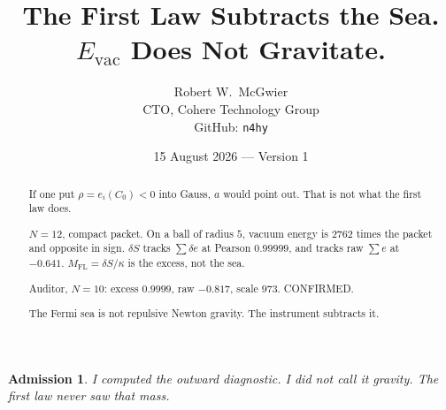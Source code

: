\documentclass[11pt]{article}
\title{\textbf{The First Law Subtracts the Sea.\\
$E_{\mathrm{vac}}$ Does Not Gravitate.}}
\author{Robert W.\ McGwier\\
\small CTO, Cohere Technology Group\\
\small GitHub: \texttt{n4hy}}
\date{15 August 2026 --- Version 1}
\newtheorem*{admission}{Admission}
\begin{document}
\maketitle

\begin{abstract}
\noindent
If one put $\rho=e_i(C_0)<0$ into Gauss, $a$ would
point out. That is not what the first law does.

$N=12$, compact packet. On a ball of radius $5$,
vacuum energy is $2762$ times the packet and
opposite in sign. $\delta S$ tracks $\sum\delta e$
at Pearson $0.99999$, and tracks raw $\sum e$ at
$-0.641$. $M_{\mathrm{FL}}=\delta S/\kappa$ is the
excess, not the sea.

Auditor, $N=10$: excess $0.9999$, raw $-0.817$,
scale $973$. CONFIRMED.

The Fermi sea is not repulsive Newton gravity.
The instrument subtracts it.
\end{abstract}

\begin{admission}
I computed the outward diagnostic. I did not call
it gravity. The first law never saw that mass.
\end{admission}
\end{document}
